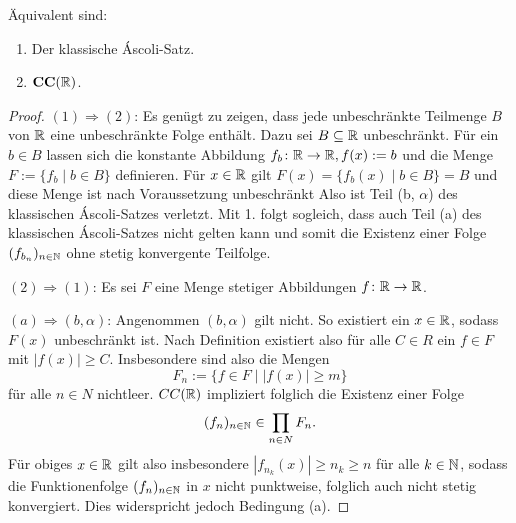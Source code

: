 \begin{thm}
  Äquivalent sind:
  \begin{enumerate}
    \item Der klassische Áscoli-Satz.
    \item $\mathbf{CC}(\mathbb{R})$.
  \end{enumerate}
\end{thm}

\begin{proof}
  $(1) \Rightarrow (2)$:
  Es genügt zu zeigen, dass jede unbeschränkte Teilmenge $B$ von $\mathbb{R}$ eine unbeschränkte Folge enthält.
  Dazu sei $B \subseteq \mathbb{R}$ unbeschränkt.
  Für ein $b \in B$ lassen sich die konstante Abbildung $f_b \colon \mathbb{R} \to \mathbb{R}, f(x):= b$ und die Menge $F := \{f_b \mid b \in B\}$ definieren.
  Für $x \in \mathbb{R}$ gilt $F(x) = \{f_b(x) \mid b \in B\} = B$ und diese Menge ist nach Voraussetzung unbeschränkt
  Also ist Teil (b, $\alpha$) des klassischen Áscoli-Satzes verletzt.
  Mit 1. folgt sogleich, dass auch Teil (a) des klassischen Áscoli-Satzes nicht gelten kann und somit die Existenz einer Folge $(f_{b_n})_{n \in \mathbb{N}}$ ohne stetig konvergente Teilfolge.

  $(2) \Rightarrow (1)$:
  Es sei $F$ eine Menge stetiger Abbildungen $f \colon \mathbb{R} \to \mathbb{R}$.

  $(a) \Rightarrow (b,\alpha)$:
  Angenommen $(b,\alpha)$ gilt nicht. So existiert ein $x \in \mathbb{R}$, sodass $F(x)$ unbeschränkt ist.
  Nach Definition existiert also für alle $C \in R$ ein $f \in F$ mit $|f(x)| \geq C$.
  Insbesondere sind also die Mengen 
  \begin{displaymath}
    F_n := \{ f \in F \mid |f(x)| \geq m \}
  \end{displaymath}
  für alle $n \in N$ nichtleer.
  $CC(\mathbb{R})$ impliziert folglich die Existenz einer Folge 
  \begin{displaymath}
    (f_n)_{n \in \mathbb{N}} \in \prod_{n \in N} F_n.
  \end{displaymath}
  Für obiges $x \in \mathbb{R}$ gilt also insbesondere $|f_{n_k}(x)| \geq n_k \geq n$ für alle $k \in \mathbb{N}$, sodass die Funktionenfolge $(f_n)_{n \in \mathbb{N}}$ in $x$ nicht punktweise, folglich auch nicht stetig konvergiert.
  Dies widerspricht jedoch Bedingung (a).


\end{proof}
